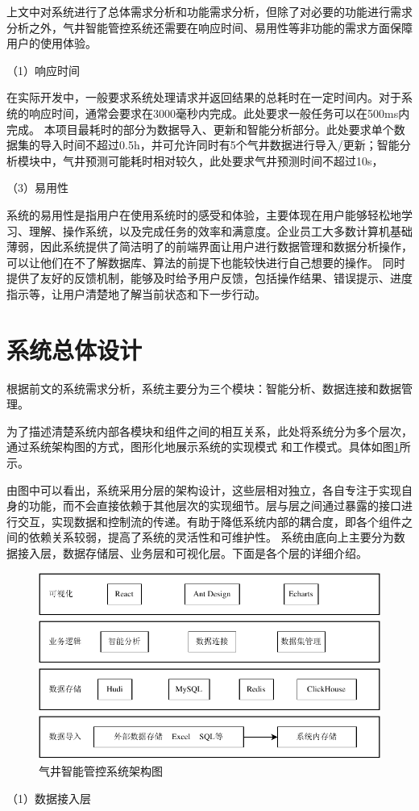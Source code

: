 上文中对系统进行了总体需求分析和功能需求分析，但除了对必要的功能进行需求分析之外，气井智能管控系统还需要在响应时间、易用性等非功能的需求方面保障用户的使用体验。

（1）响应时间

在实际开发中，一般要求系统处理请求并返回结果的总耗时在一定时间内。对于系统的响应时间，通常会要求在3000毫秒内完成。此处要求一般任务可以在500ms内完成。
本项目最耗时的部分为数据导入、更新和智能分析部分。此处要求单个数据集的导入时间不超过0.5h，并可允许同时有5个气井数据进行导入/更新；智能分析模块中，气井预测可能耗时相对较久，此处要求气井预测时间不超过10s，

（3）易用性

系统的易用性是指用户在使用系统时的感受和体验，主要体现在用户能够轻松地学习、理解、操作系统，以及完成任务的效率和满意度。企业员工大多数计算机基础薄弱，因此系统提供了简洁明了的前端界面让用户进行数据管理和数据分析操作，可以让他们在不了解数据库、算法的前提下也能较快进行自己想要的操作。
同时提供了友好的反馈机制，能够及时给予用户反馈，包括操作结果、错误提示、进度指示等，让用户清楚地了解当前状态和下一步行动。
\section{系统总体设计}
根据前文的系统需求分析，系统主要分为三个模块：智能分析、数据连接和数据管理。

为了描述清楚系统内部各模块和组件之间的相互关系，此处将系统分为多个层次，通过系统架构图的方式，图形化地展示系统的实现模式
和工作模式。具体如图\ref{fig:sysstruc}所示。

由图中可以看出，系统采用分层的架构设计，这些层相对独立，各自专注于实现自身的功能，而不会直接依赖于其他层次的实现细节。层与层之间通过暴露的接口进行交互，实现数据和控制流的传递。有助于降低系统内部的耦合度，即各个组件之间的依赖关系较弱，提高了系统的灵活性和可维护性。
系统由底向上主要分为数据接入层，数据存储层、业务层和可视化层。下面是各个层的详细介绍。
\begin{figure}[H]
    \centering
    \includegraphics[width=.9\linewidth]{figure/系统架构图.pdf}
    \caption{气井智能管控系统架构图}
    \label{fig:sysstruc}
\end{figure}
（1）数据接入层

